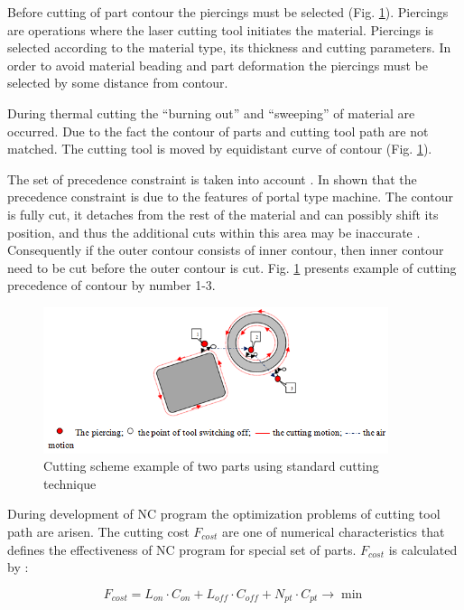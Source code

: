 \documentclass[runningheads]{llncs}
\begin{document}
Before cutting of part contour the piercings must be selected (Fig. \ref{elements}).
Piercings are operations where the laser cutting tool initiates the material.
Piercings is selected according to the material type, its thickness and cutting parameters.
In order to avoid material beading and part deformation the piercings must be selected by some distance from contour.

During thermal cutting the ``burning out'' and ``sweeping'' of material are occurred.
Due to the fact the contour of parts and cutting tool path are not matched.
The cutting tool is moved by equidistant curve of contour (Fig. \ref{elements}).

The set of precedence constraint is taken into account \cite{ru01}.
In \cite{ru02} shown that the precedence constraint is due to the features of portal type machine.
The contour is fully cut, it detaches from the rest of the material and can possibly shift its position,
and thus the additional cuts within this area may be inaccurate \cite{Dewil2015}.
Consequently if the outer contour consists of inner contour,
then inner contour need to be cut before the outer contour is cut.
Fig. \ref{elements} presents example of cutting precedence of contour by number 1-3.

\begin{figure}
  \begin{center}
  \includegraphics[width=0.9\textwidth]{elements.png}
  \caption{Cutting scheme example of two parts using standard cutting technique}
  \label{elements}
  \end{center}
\end{figure}

During development of NC program the optimization problems of cutting tool path are arisen.
The cutting cost $F_{cost}$ are one of numerical characteristics
that defines the effectiveness of NC program for special set of parts.
$F_{cost}$ is calculated by \cite{ru04}:

\begin{equation}
F_{cost} =
L_{on} \cdot C_{on} +
L_{off} \cdot C_{off} +
N_{pt} \cdot C_{pt}
\to \min
\label{cost}
\end{equation}
\end{document}
